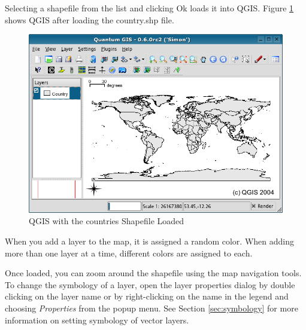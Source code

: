 \documentclass[10pt,english]{article}
\newcommand\qgistip[1]{\raggedright\small{#1}}
\begin{document}
\begin{onehalfspace}
\begin{figure}[h]
\end{figure}
Selecting a shapefile from the list and clicking Ok loads it into QGIS. Figure \ref{fig:loadedshapefile}
shows QGIS after loading the country.shp file.
\begin{figure}[h]
   \begin{center}
   \caption{QGIS with the countries Shapefile Loaded}\label{fig:loadedshapefile}\smallskip
   \includegraphics[scale=.6]{qgis_user_guide_images/shapefileloaded}
\end{center}  
   
\end{figure}
\begin{Tip}\caption{\textsc{Layer Colors}}
\qgistip{When you add a layer to the map, it is assigned a random color. When adding more than one layer at a time, different colors are assigned to each. }
\end{Tip}

Once loaded, you can zoom around the shapefile using the map navigation tools. To change the symbology of a layer, open the layer properties dialog by double clicking on the layer name or by right-clicking on the name in the legend and choosing \textsl{Properties} from the popup menu. See Section \ref{sec:symbology} for more information on setting symbology of vector layers.

\end{onehalfspace}
\end{document}
